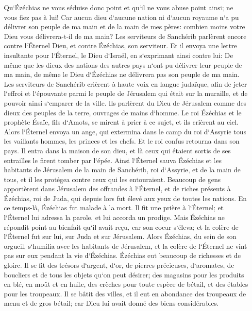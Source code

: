 \verse Qu`Ézéchias ne vous séduise donc point et qu`il ne vous abuse point ainsi; ne vous fiez pas à lui! Car aucun dieu d`aucune nation ni d`aucun royaume n`a pu délivrer son peuple de ma main et de la main de mes pères: combien moins votre Dieu vous délivrera-t-il de ma main? 
\verse Les serviteurs de Sanchérib parlèrent encore contre l`Éternel Dieu, et contre Ézéchias, son serviteur. 
\verse Et il envoya une lettre insultante pour l`Éternel, le Dieu d`Israël, en s`exprimant ainsi contre lui: De même que les dieux des nations des autres pays n`ont pu délivrer leur peuple de ma main, de même le Dieu d`Ézéchias ne délivrera pas son peuple de ma main. 
\verse Les serviteurs de Sanchérib crièrent à haute voix en langue judaïque, afin de jeter l`effroi et l`épouvante parmi le peuple de Jérusalem qui était sur la muraille, et de pouvoir ainsi s`emparer de la ville. 
\verse Ils parlèrent du Dieu de Jérusalem comme des dieux des peuples de la terre, ouvrages de mains d`homme. 
\verse Le roi Ézéchias et le prophète Ésaïe, fils d`Amots, se mirent à prier à ce sujet, et ils crièrent au ciel. 
\verse Alors l`Éternel envoya un ange, qui extermina dans le camp du roi d`Assyrie tous les vaillants hommes, les princes et les chefs. Et le roi confus retourna dans son pays. Il entra dans la maison de son dieu, et là ceux qui étaient sortis de ses entrailles le firent tomber par l`épée. 
\verse Ainsi l`Éternel sauva Ézéchias et les habitants de Jérusalem de la main de Sanchérib, roi d`Assyrie, et de la main de tous, et il les protégea contre ceux qui les entouraient. 
\verse Beaucoup de gens apportèrent dans Jérusalem des offrandes à l`Éternel, et de riches présents à Ézéchias, roi de Juda, qui depuis lors fut élevé aux yeux de toutes les nations. 
\verse En ce temps-là, Ézéchias fut malade à la mort. Il fit une prière à l`Éternel; et l`Éternel lui adressa la parole, et lui accorda un prodige. 
\verse Mais Ézéchias ne répondit point au bienfait qu`il avait reçu, car son coeur s`éleva; et la colère de l`Éternel fut sur lui, sur Juda et sur Jérusalem. 
\verse Alors Ézéchias, du sein de son orgueil, s`humilia avec les habitants de Jérusalem, et la colère de l`Éternel ne vint pas sur eux pendant la vie d`Ézéchias. 
\verse Ézéchias eut beaucoup de richesses et de gloire. Il se fit des trésors d`argent, d`or, de pierres précieuses, d`aromates, de boucliers et de tous les objets qu`on peut désirer; 
\verse des magasins pour les produits en blé, en moût et en huile, des crèches pour toute espèce de bétail, et des étables pour les troupeaux. 
\verse Il se bâtit des villes, et il eut en abondance des troupeaux de menu et de gros bétail; car Dieu lui avait donné des biens considérables. 
